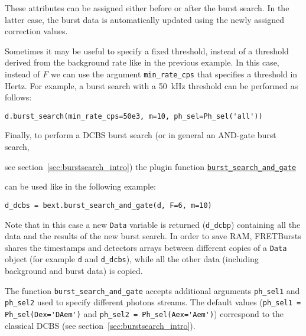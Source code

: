 These attributes can be assigned either before or after the burst search. In the
latter case, the burst data is
automatically updated using the newly assigned correction values.

Sometimes it may be useful to specify a fixed threshold, instead 
of a threshold derived from the background rate like in the previous example. In
this case, instead of $F$ we can use the argument \verb|min_rate_cps| that
specifies a threshold in Hertz. For example, a burst search with a 50~kHz
threshold can be performed as follows:

\begin{verbatim}
d.burst_search(min_rate_cps=50e3, m=10, ph_sel=Ph_sel('all'))
\end{verbatim}

Finally, to perform a DCBS burst search (or in general an AND-gate burst search,

see section~\ref{sec:burstsearch_intro}) the plugin function 
\href{http://fretbursts.readthedocs.org/en/latest/plugins.html#fretbursts.burstlib\_ext.burst\_search\_and\_gate}{\texttt{burst\_search\_and\_gate}}

can be used like in the following example:

\begin{verbatim}
d_dcbs = bext.burst_search_and_gate(d, F=6, m=10)
\end{verbatim}

Note that in this case a new \verb|Data| variable is returned (\verb|d_dcbp|)
containing all the data and the results of the new burst search. In order to
save RAM, FRETBursts shares the timestamps and detectors arrays between
different copies of a \verb|Data| object (for example \verb|d| and
\verb|d_dcbs|), while all the other data (including background and burst data)
is copied. 

The function \verb|burst_search_and_gate| accepts additional arguments
\verb|ph_sel1| and \verb|ph_sel2| 
used to specify different photons streams. The default values 
(\verb|ph_sel1 = Ph_sel(Dex='DAem')| and \verb|ph_sel2 = Ph_sel(Aex='Aem')|)
correspond to the classical DCBS 
(see section~\ref{sec:burstsearch_intro}).


